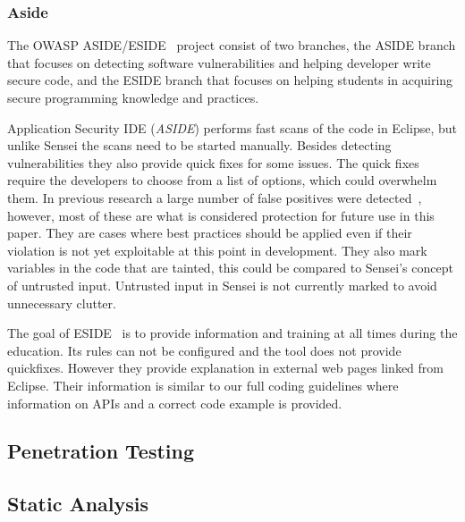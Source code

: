 \subsubsection{Aside}
The OWASP ASIDE/ESIDE~\cite{aside} project consist of two branches, the ASIDE branch that focuses on detecting software vulnerabilities and helping developer write secure code, and the ESIDE branch that focuses on helping students in acquiring secure programming knowledge and practices.

Application Security IDE (\emph{ASIDE}) performs fast scans of the code in Eclipse, but unlike Sensei the scans need to be started manually. Besides detecting vulnerabilities they also provide quick fixes for some issues. The quick fixes require the developers to choose from a list of options, which could overwhelm them. In previous research a large number of false positives were detected~\cite{xie2011aside}, however, most of these are what is considered protection for future use in this paper. They are cases where best practices should be applied even if their violation is not yet exploitable at this point in development. They also mark variables in the code that are tainted, this could be compared to Sensei's concept of untrusted input. Untrusted input in Sensei is not currently marked to avoid unnecessary clutter. 

The goal of ESIDE~\cite{eside,whitney2018embedding} is to provide information and training at all times during the education. Its rules can not be configured and the tool does not provide quickfixes. However they provide explanation in external web pages linked from Eclipse. Their information is similar to our full coding guidelines where information on APIs and a correct code example is provided. 


\subsection{Penetration Testing}


\subsection{Static Analysis}





